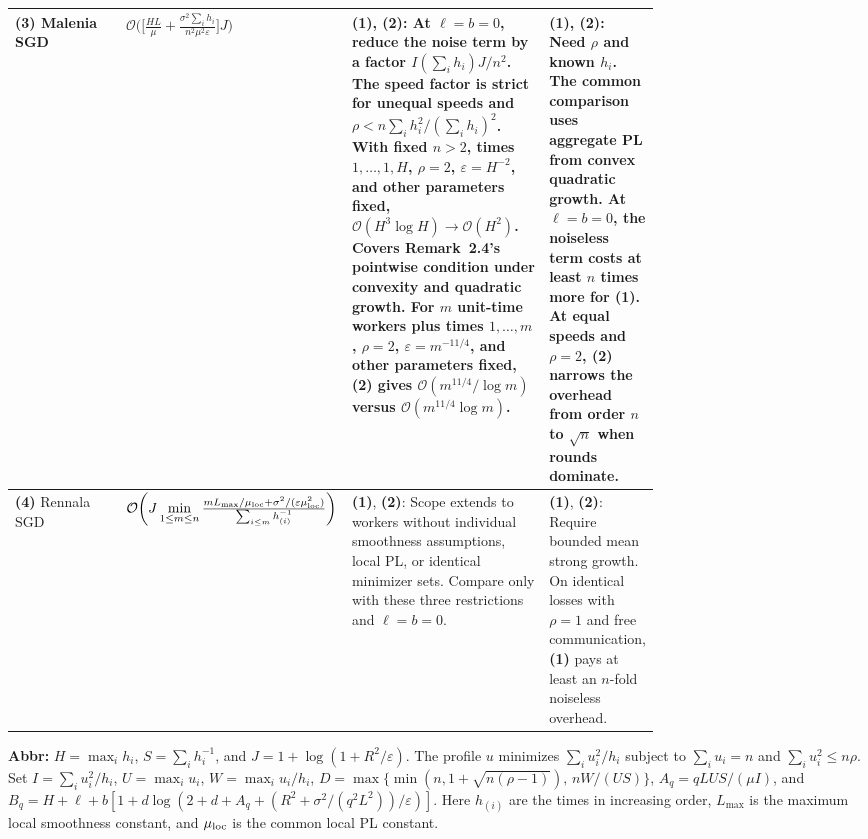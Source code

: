 \begin{table}[tp]
\begin{threeparttable}
\begin{tabularx}{\linewidth}{@{}>{\raggedright\arraybackslash}p{0.18\linewidth}>{\raggedright\arraybackslash}p{0.26\linewidth}>{\raggedright\arraybackslash}p{0.31\linewidth}>{\raggedright\arraybackslash}X@{}}
\midrule[1.2pt]
\textbf{(3)} Malenia SGD \citep[Thm.~F.2]{dwiTyurin2026v1}
& \(\displaystyle\mathcal{O}\biggl(\biggl[\frac{HL}{\mu}+\frac{\sigma^2\sum_i h_i}{n^2\mu^2\varepsilon}\biggr]J\biggr)\)
& \textbf{(1)}, \textbf{(2)}: At \(\ell=b=0\), reduce the noise term by a factor \(I(\sum_i h_i)J/n^2\). The speed factor is strict for unequal speeds and \(\rho<n\sum_i h_i^2/(\sum_i h_i)^2\). With fixed \(n>2\), times \(1,\ldots,1,H\), \(\rho=2\), \(\varepsilon=H^{-2}\), and other parameters fixed, \(\mathcal{O}(H^3\log H)\to\mathcal{O}(H^2)\). Covers Remark~2.4's pointwise condition under convexity and quadratic growth. For \(m\) unit-time workers plus times \(1,\ldots,m\), \(\rho=2\), \(\varepsilon=m^{-11/4}\), and other parameters fixed, \textbf{(2)} gives \(\mathcal{O}(m^{11/4}/\log m)\) versus \(\mathcal{O}(m^{11/4}\log m)\).
& \textbf{(1)}, \textbf{(2)}: Need \(\rho\) and known \(h_i\). The common comparison uses aggregate PL from convex quadratic growth. At \(\ell=b=0\), the noiseless term costs at least \(n\) times more for \textbf{(1)}. At equal speeds and \(\rho=2\), \textbf{(2)} narrows the overhead from order \(n\) to \(\sqrt n\) when rounds dominate. \\
\midrule
\textbf{(4)} Rennala SGD \citep[Thm.~3.8]{dwiTyurin2026v1}
& \(\mathcal{O}\biggl(J\min\limits_{1\le m\le n}\allowbreak\frac{mL_{\max}/\mu_{\rm loc}+\sigma^2/(\varepsilon\mu_{\rm loc}^2)}{\sum_{i\le m}h_{(i)}^{-1}}\biggr)\)
& \textbf{(1)}, \textbf{(2)}: Scope extends to workers without individual smoothness assumptions, local PL, or identical minimizer sets. Compare only with these three restrictions and \(\ell=b=0\).
& \textbf{(1)}, \textbf{(2)}: Require bounded mean strong growth. On identical losses with \(\rho=1\) and free communication, \textbf{(1)} pays at least an \(n\)-fold noiseless overhead. \\
\bottomrule
\end{tabularx}
\begin{tablenotes}[flushleft]\footnotesize
\item[] \textbf{Abbr:} \(H=\max_i h_i\), \(S=\sum_i h_i^{-1}\), and \(J=1+\log(1+R^2/\varepsilon)\).
The profile \(u\) minimizes \(\sum_i u_i^2/h_i\) subject to \(\sum_i u_i=n\) and \(\sum_i u_i^2\le n\rho\).
Set \(I=\sum_i u_i^2/h_i\), \(U=\max_i u_i\), \(W=\max_i u_i/h_i\),
\(D=\max\{\min(n,1+\sqrt{n(\rho-1)}),\,nW/(US)\}\),
\(A_q=qLUS/(\mu I)\), and
\(B_q=H+\ell+b[1+d\log(2+d+A_q+(R^2+\sigma^2/(q^2L^2))/\varepsilon)]\).
Here \(h_{(i)}\) are the times in increasing order, \(L_{\max}\) is the maximum local smoothness constant, and \(\mu_{\rm loc}\) is the common local PL constant.
\end{tablenotes}
\end{threeparttable}
\end{table}
